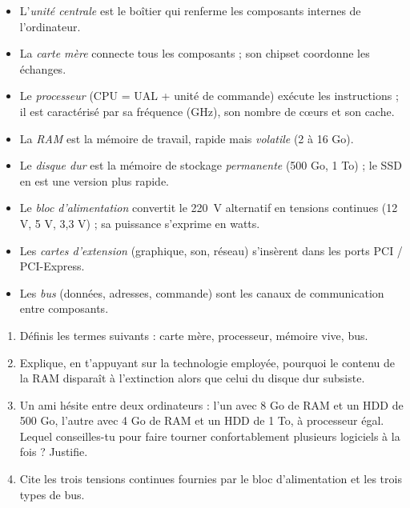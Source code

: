 \documentclass[11pt]{article}
\begin{document}
\begin{aretenir}
\begin{itemize}
\item L'\emph{unité centrale} est le boîtier qui renferme les composants internes de l'ordinateur.
\item La \emph{carte mère} connecte tous les composants ; son chipset coordonne les échanges.
\item Le \emph{processeur} (CPU = UAL + unité de commande) exécute les instructions ; il est caractérisé par sa fréquence (GHz), son nombre de cœurs et son cache.
\item La \emph{RAM} est la mémoire de travail, rapide mais \emph{volatile} (2 à 16 Go).
\item Le \emph{disque dur} est la mémoire de stockage \emph{permanente} (500 Go, 1 To) ; le SSD en est une version plus rapide.
\item Le \emph{bloc d'alimentation} convertit le \SI{220}{V} alternatif en tensions continues (12 V, 5 V, 3,3 V) ; sa puissance s'exprime en watts.
\item Les \emph{cartes d'extension} (graphique, son, réseau) s'insèrent dans les ports PCI / PCI-Express.
\item Les \emph{bus} (données, adresses, commande) sont les canaux de communication entre composants.
\end{itemize}
\end{aretenir}

\begin{exercice}
\begin{enumerate}
\item Définis les termes suivants : carte mère, processeur, mémoire vive, bus.
\item Explique, en t'appuyant sur la technologie employée, pourquoi le contenu de la RAM disparaît à l'extinction alors que celui du disque dur subsiste.
\item Un ami hésite entre deux ordinateurs : l'un avec 8 Go de RAM et un HDD de 500 Go, l'autre avec 4 Go de RAM et un HDD de 1 To, à processeur égal. Lequel conseilles-tu pour faire tourner confortablement plusieurs logiciels à la fois ? Justifie.
\item Cite les trois tensions continues fournies par le bloc d'alimentation et les trois types de bus.
\end{enumerate}
\end{exercice}
\end{document}
